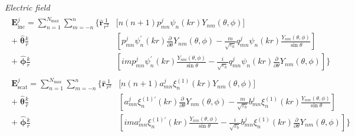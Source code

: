 \documentclass[11pt]{article}
\begin{document}
\textit{Electric field}
\begin{align}
\begin{split}
    \boldsymbol{E}_\text{inc}^j = \sum_{n=1}^{N_\text{max}} \sum_{m=-n}^{n} \bigg\{
    \boldsymbol{\hat r}\frac{1}{r^2} &\bigg[ n(n+1) p_{mn}^j \psi_n(kr) Y_{nm}(\theta,\phi) \bigg] \\
    +\; \boldsymbol{\hat \theta}\frac{k}{r} &\left[ p_{mn}^j \psi_n^\prime(kr) \frac{\partial}{\partial \theta} Y_{nm}(\theta,\phi)
    - \frac{m}{\sqrt{\varepsilon_b}} q_{mn}^j \psi_n(kr) \frac{Y_{nm}(\theta,\phi)}{\sin\theta} \right] \\
    +\; \boldsymbol{\hat \phi}\frac{k}{r} &\left[ im p_{mn}^j \psi_n^\prime(kr) \frac{Y_{nm}(\theta,\phi)}{\sin\theta}
    - \frac{i}{\sqrt{\varepsilon_b}} q_{mn}^j \psi_n(kr) \frac{\partial}{\partial \theta} Y_{nm}(\theta,\phi) \right] \bigg\}
\end{split}
\end{align}
\begin{align}
\begin{split}
    \boldsymbol{E}_\text{scat}^j = \sum_{n=1}^{N_\text{max}} \sum_{m=-n}^{n} \bigg\{
    \boldsymbol{\hat r}\frac{1}{r^2} &\bigg[ n(n+1) a_{mn}^j \xi_n^{(1)}(kr) Y_{nm}(\theta,\phi) \bigg] \\
    +\; \boldsymbol{\hat \theta}\frac{k}{r} &\left[ a_{mn}^j \xi_n^{(1)\prime}(kr) \frac{\partial}{\partial \theta} Y_{nm}(\theta,\phi)
    - \frac{m}{\sqrt{\varepsilon_b}} b_{mn}^j \xi_n^{(1)}(kr) \frac{Y_{nm}(\theta,\phi)}{\sin\theta} \right] \\
    +\; \boldsymbol{\hat \phi}\frac{k}{r} &\left[ im a_{mn}^j \xi_n^{(1)\prime}(kr) \frac{Y_{nm}(\theta,\phi)}{\sin\theta}
    - \frac{i}{\sqrt{\varepsilon_b}} b_{mn}^j \xi_n^{(1)}(kr) \frac{\partial}{\partial \theta} Y_{nm}(\theta,\phi) \right] \bigg\}
\end{split}
\end{align}
\end{document}
